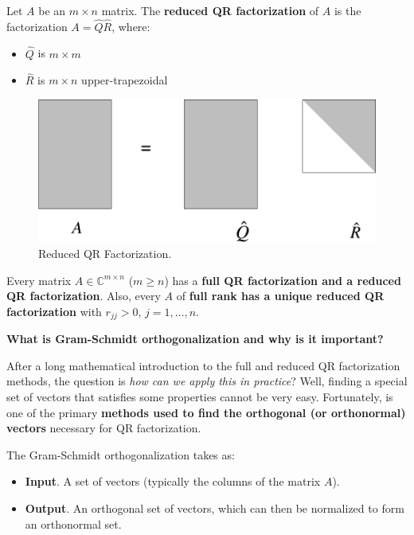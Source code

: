 \highspace
Let $A$ be an $m \times n$ matrix. The \textbf{reduced QR factorization} of $A$ is the factorization $A = \widehat{Q}\widehat{R}$, where:
\begin{itemize}
    \item $\widehat{Q}$ is $m \times m$
    \item $\widehat{R}$ is $m \times n$ upper-trapezoidal
\end{itemize}
\begin{figure}[!htp]
    \centering
    \includegraphics[width=.5\textwidth]{img/reduced-qr-factorization-1.pdf}
    \caption{Reduced QR Factorization.}
\end{figure}

\noindent
Every matrix $A \in \mathbb{C}^{m \times n}$ ($m \ge n$) has a \textbf{full QR factorization and a reduced QR factorization}. Also, every $A$ of \textbf{full rank has a unique reduced QR factorization} with $r_{jj} > 0$, $j = 1, \dots, n$.

\newpage

\begin{flushleft}
    \textcolor{Green3}{ \textbf{What is Gram-Schmidt orthogonalization and why is it important?}}
\end{flushleft}
After a long mathematical introduction to the full and reduced QR factorization methods, the question is \emph{how can we apply this in practice}? Well, finding a special set of vectors that satisfies some properties cannot be very easy. Fortunately,  is one of the primary \textbf{methods used to find the orthogonal (or orthonormal) vectors} necessary for QR factorization.

\highspace
The Gram-Schmidt orthogonalization takes as:
\begin{itemize}
    \item \textbf{Input}. A set of vectors (typically the columns of the matrix $A$).
    
    \item \textbf{Output}. An orthogonal set of vectors, which can then be normalized to form an orthonormal set.
\end{itemize}

